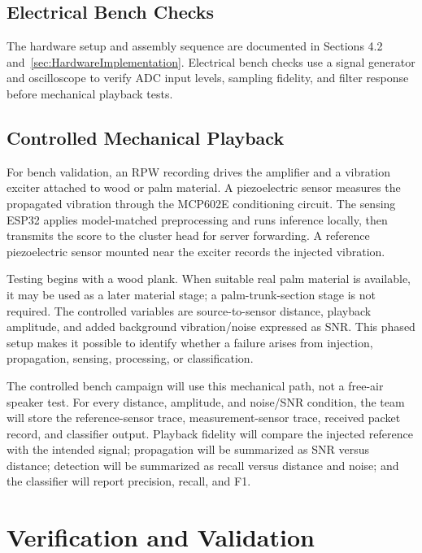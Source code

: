 \documentclass[12pt,a4paper,oneside]{memoir}
\newcommand{\newrevision}[1]{#1}
\begin{document}
\subsection{\newrevision{Electrical Bench Checks}}
\newrevision{The hardware setup and assembly sequence are documented in Sections 4.2 and~\ref{sec:HardwareImplementation}. Electrical bench checks use a signal generator and oscilloscope to verify ADC input levels, sampling fidelity, and filter response before mechanical playback tests.}

\subsection{\newrevision{Controlled Mechanical Playback}}
\label{sec:mechanical_playback}

\newrevision{For bench validation, an RPW recording drives the amplifier and a vibration exciter attached to wood or palm material. A piezoelectric sensor measures the propagated vibration through the MCP602E conditioning circuit. The sensing ESP32 applies model-matched preprocessing and runs inference locally, then transmits the score to the cluster head for server forwarding. A reference piezoelectric sensor mounted near the exciter records the injected vibration.}

\newrevision{Testing begins with a wood plank. When suitable real palm material is available, it may be used as a later material stage; a palm-trunk-section stage is not required. The controlled variables are source-to-sensor distance, playback amplitude, and added background vibration/noise expressed as SNR. This phased setup makes it possible to identify whether a failure arises from injection, propagation, sensing, processing, or classification.}

\newrevision{The controlled bench campaign will use this mechanical path, not a free-air speaker test. For every distance, amplitude, and noise/SNR condition, the team will store the reference-sensor trace, measurement-sensor trace, received packet record, and classifier output. Playback fidelity will compare the injected reference with the intended signal; propagation will be summarized as SNR versus distance; detection will be summarized as recall versus distance and noise; and the classifier will report precision, recall, and F1.}

\section{Verification and Validation}
\end{document}
